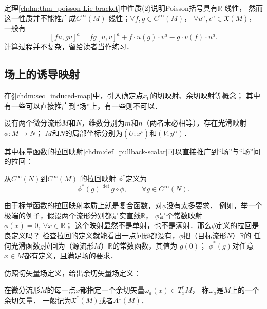 定理\ref{chdm:thm_poisson-Lie-bracket}中性质(2)说明Poisson括号具有$\mathbb{R}$-线性，
然而这一性质并不能推广成$C^\infty(M)$-线性；$\forall f,g\in C^\infty (M)$，
$\forall u^a,v^a \in \mathfrak{X}(M)$，一般有
\begin{equation}\label{chdm:eqn_fg-PoissonBracket}
    [f u, g v]^a = fg[u,v]^a+f\cdot u(g)\cdot v^a -g\cdot v(f)\cdot u^a .
\end{equation}
计算过程并不复杂，留给读者当作练习．



\subsection{场上的诱导映射}\label{chdm:sec_induced-map-on-fields}
在\S\ref{chdm:sec_induced-map}中，引入确定点$x_0$的切映射、余切映射等概念；
其中有一些可以直接推广到“场”上，有一些则不可以．

设有两个微分流形$M$和$N$，维数分别为$m$和$n$（两者未必相等），存在光滑映射$\phi:M\to N$；
$M$和$N$的局部坐标分别为$(U;x^i)$和$(V;y^\alpha)$．

其中标量函数的拉回映射\ref{chdm:def_pullback-scalar}可以直接推广到“场”与“场”间的拉回：
\begin{definition}\label{chdm:def_pullback-scalar-onfield}
    从$C^\infty(N)$到$C^\infty(M)$
    的{\heiti 拉回映射} $\phi^{*}$定义为
    \begin{equation}
        \phi^{*}(g) \overset{\mathrm {def}}{=} g \circ \phi, 
        \qquad \forall g\in C^\infty(N) .
    \end{equation}
\end{definition}

由于标量函数的拉回映射本质上就是复合函数，对$\phi$没有太多要求．
例如，举一个极端的例子，假设两个流形分别都是实直线$\mathbb{R}$，
$\phi$是个常数映射 $\phi(x)=0,\ \forall x \in \mathbb{R}$；
这个映射显然不是单射，也不是满射．那么$\phi$定义的拉回是良定义吗？
检查拉回的定义就能看出一点问题都没有，$\phi$把（目标流形$N$）$\mathbb{R}$的
任何光滑函数$g$拉回为（源流形$M$）$\mathbb{R}$的常数函数，其值为 $g(0)$；
$\phi^*(g)$对任意$x\in M$都有定义，且满足场的要求．

仿照切矢量场定义，给出余切矢量场定义：
\begin{definition}\label{chdm:def_cotangent-vector-field}
    在微分流形$M$的每一点$x$都指定一个余切矢量$\omega_a(x)\in T^{*}_xM$，
    称$\omega_a$是$M$上的一个{\heiti 余切矢量}．
    一般记为$\mathfrak{X}^{*}(M)$或者$A^1(M)$．
\end{definition}


